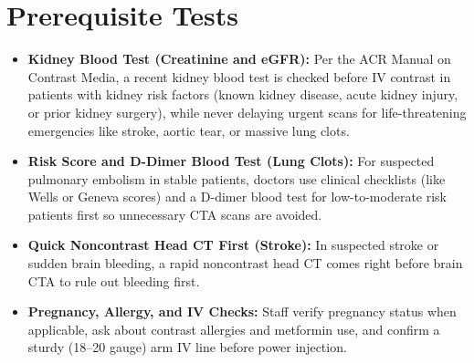 \section{Prerequisite Tests}
\begin{itemize}
    \item \textbf{Kidney Blood Test (Creatinine and eGFR):} Per the ACR Manual on Contrast Media, a recent kidney blood test is checked before IV contrast in patients with kidney risk factors (known kidney disease, acute kidney injury, or prior kidney surgery), while never delaying urgent scans for life-threatening emergencies like stroke, aortic tear, or massive lung clots.
    \item \textbf{Risk Score and D-Dimer Blood Test (Lung Clots):} For suspected pulmonary embolism in stable patients, doctors use clinical checklists (like Wells or Geneva scores) and a D-dimer blood test for low-to-moderate risk patients first so unnecessary CTA scans are avoided.
    \item \textbf{Quick Noncontrast Head CT First (Stroke):} In suspected stroke or sudden brain bleeding, a rapid noncontrast head CT comes right before brain CTA to rule out bleeding first.
    \item \textbf{Pregnancy, Allergy, and IV Checks:} Staff verify pregnancy status when applicable, ask about contrast allergies and metformin use, and confirm a sturdy (18--20 gauge) arm IV line before power injection.
\end{itemize}

